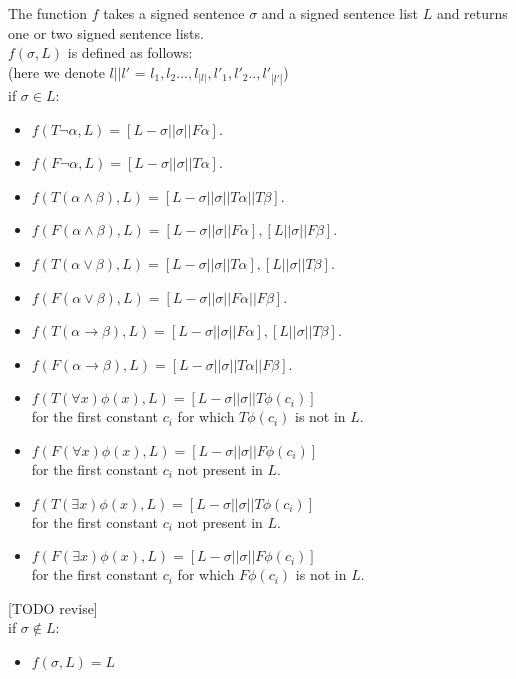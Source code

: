 \documentclass[runningheads]{llncs}
\begin{document}
\begin{definition}
    The function $f$ takes a signed sentence $\sigma$ and a signed sentence list $L$ and returns one or two signed sentence lists.  \\$f(\sigma,L)$ is defined as follows:
    \\(here we denote $l||l'$ = $l_1,l_2...,l_{|l|}, l'_1,l'_2..,l'_{|l'|} $)
    \\if $\sigma \in L$:
        \begin{itemize}
            \item $f(T \neg \alpha,L) = [L - \sigma|| \sigma || F \alpha]$.
            \item $f(F \neg \alpha,L) = [L - \sigma || \sigma || T \alpha]$.
            \item $f(T (\alpha \land \beta), L) = [L - \sigma|| \sigma || T \alpha || T \beta]$.
            \item $f(F (\alpha \land \beta), L) = [L - \sigma|| \sigma || F \alpha],[ L || \sigma || F \beta]$.
            \item $f(T (\alpha \lor \beta), L) = [L - \sigma|| \sigma || T \alpha],[ L || \sigma || T \beta]$.
            \item $f(F (\alpha \lor \beta), L) = [L - \sigma|| \sigma || F \alpha || F \beta]$.
            \item $f(T (\alpha \to \beta), L) = [L - \sigma|| \sigma || F \alpha],[ L || \sigma || T \beta]$.
            \item $f(F (\alpha \to \beta), L) = [L - \sigma|| \sigma || T \alpha || F \beta]$.
            \item $f(T (\forall x) \phi(x), L) = [L - \sigma|| \sigma || T \phi(c_i)]$ \\ for the first constant $c_i$ for which $T \phi(c_i)$ is not in $L$.
            \item $f(F (\forall x) \phi(x), L) = [L - \sigma|| \sigma || F \phi(c_i)]$ \\ for the first constant $c_i$ not present in $L$.
            \item $f(T (\exists x) \phi(x), L) = [L - \sigma|| \sigma || T \phi(c_i)]$ \\ for the first constant $c_i$ not present in $L$.
            \item $f(F (\exists x) \phi(x), L) = [L - \sigma|| \sigma || F \phi(c_i)]$ \\ for the first constant $c_i$ for which $F \phi(c_i)$ is not in $L$.
        \end{itemize} [TODO revise] \\
    if $\sigma \notin L$:
    \begin{itemize}
         \item $f(\sigma,L) = L $
    \end{itemize}
\end{definition}
\end{document}
